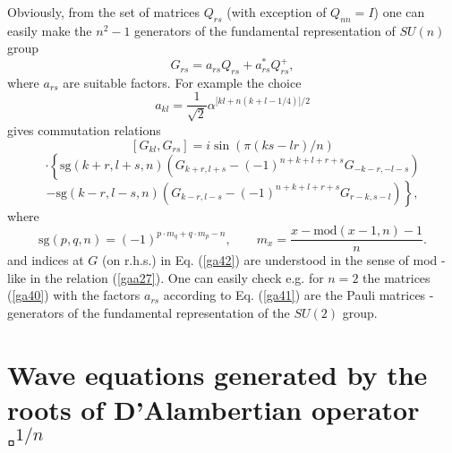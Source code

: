 \documentclass[a4paper,a4paper]{article}
\begin{document}
Obviously, from the set of matrices $Q_{rs}$ (with exception of $Q_{nn}=I$)
one can easily make the $n^{2}-1$ generators of the fundamental
representation of $SU(n)$ group 
\begin{equation}
G_{rs}=a_{rs}Q_{rs}+a_{rs}^{\ast }Q_{rs}^{+},  \label{ga40}
\end{equation}%
where $a_{rs}$ are suitable factors. For example the choice 
\begin{equation}
a_{kl}=\frac{1}{\sqrt{2}}\alpha ^{\lbrack kl+n(k+l-1/4)]/2}  \label{ga41}
\end{equation}%
gives commutation relations%
\begin{equation}
\left[ G_{kl},G_{rs}\right] =i\sin \left( \pi (ks-lr)/n\right)   \label{ga42}
\end{equation}%
\begin{equation*}
\cdot \left\{ \mathrm{sg}(k+r,l+s,n)\left(
G_{k+r,l+s}-(-1)^{n+k+l+r+s}G_{-k-r,-l-s}\right) \right. 
\end{equation*}%
\begin{equation*}
-\left. \mathrm{sg}(k-r,l-s,n)\left(
G_{k-r,l-s}-(-1)^{n+k+l+r+s}G_{r-k,s-l}\right) \right\} ,
\end{equation*}%
where%
\begin{equation*}
\mathrm{sg}(p,q,n)=(-1)^{p\cdot m_{q}+q\cdot m_{p}-n},\qquad m_{x}=\frac{x-%
\text{mod}(x-1,n)-1}{n}.
\end{equation*}%
and indices at $G$ (on r.h.s.) in Eq. (\ref{ga42}) are understood in the
sense of mod - like in the relation (\ref{gaa27}). One can easily check e.g.
for $n=2$ the matrices (\ref{ga40}) with the factors $a_{rs}$ according to
Eq. (\ref{ga41}) are the Pauli matrices - generators of the fundamental
representation of the $SU(2)$ group.

\section{Wave equations generated by the roots \newline
of D'Alambertian operator $\square ^{1/n}$}
\end{document}
